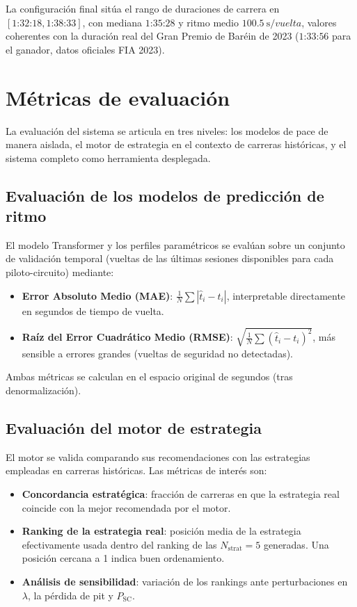 La configuración final sitúa el rango de duraciones de carrera en $[1\text{:}32\text{:}18, 1\text{:}38\text{:}33]$, con mediana $1\text{:}35\text{:}28$ y ritmo medio $100.5~\si{\second\per vuelta}$, valores coherentes con la duración real del Gran Premio de Baréin de 2023 ($1\text{:}33\text{:}56$ para el ganador, datos oficiales FIA 2023).

\section{Métricas de evaluación}
\label{sec:metricas}
La evaluación del sistema se articula en tres niveles: los modelos de pace de manera aislada, el motor de estrategia en el contexto de carreras históricas, y el sistema completo como herramienta desplegada.
\subsection{Evaluación de los modelos de predicción de ritmo}
\label{ssec:metricas_pace}

El modelo Transformer y los perfiles paramétricos se evalúan sobre un conjunto de validación temporal (vueltas de las últimas sesiones disponibles para cada piloto-circuito) mediante:
\begin{itemize}
    \item \textbf{Error Absoluto Medio (MAE)}: $\frac{1}{N}\sum|\hat{t}_i - t_i|$, interpretable directamente en segundos de tiempo de vuelta.
    \item \textbf{Raíz del Error Cuadrático Medio (RMSE)}: $\sqrt{\frac{1}{N}\sum(\hat{t}_i - t_i)^2}$, más sensible a errores grandes (vueltas de seguridad no detectadas).
\end{itemize}
Ambas métricas se calculan en el espacio original de segundos (tras denormalización).
\subsection{Evaluación del motor de estrategia}
\label{ssec:metricas_motor}
El motor se valida comparando sus recomendaciones con las estrategias empleadas en carreras históricas. Las métricas de interés son:
\begin{itemize}
    \item \textbf{Concordancia estratégica}: fracción de carreras en que la estrategia real coincide con la mejor recomendada por el motor.
    \item \textbf{Ranking de la estrategia real}: posición media de la estrategia efectivamente usada dentro del ranking de las $N_{\text{strat}} = 5$ generadas. Una posición cercana a 1 indica buen ordenamiento.
    \item \textbf{Análisis de sensibilidad}: variación de los rankings ante perturbaciones en $\lambda$, la pérdida de pit y $P_{\text{SC}}$.
\end{itemize}
